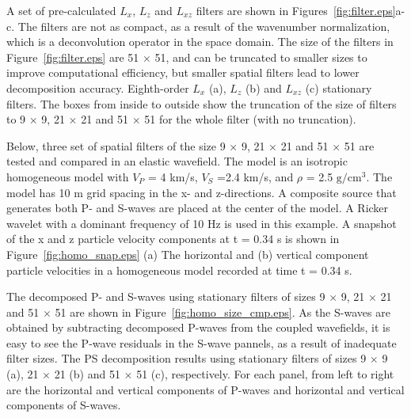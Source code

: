 \documentclass[manuscript,ulem,graphix,revised]{geophysics}
\begin{document}
A set of pre-calculated $L_x$, $L_z$ and $L_{xz}$ filters are shown in Figures~\ref{fig:filter.eps}a-c. The filters are not as compact, as a result of the wavenumber normalization, which is a deconvolution operator in the space domain. The size of the filters in Figure~\ref{fig:filter.eps} are 51 $\times$ 51, and can be truncated to smaller sizes to improve computational efficiency, but smaller spatial filters lead to lower decomposition accuracy. 
{
Eighth-order $L_x$ (a), $L_z$ (b) and $L_{xz}$ (c) stationary filters. The boxes from inside to outside show the truncation of the size of filters to 9 $\times$ 9, 21 $\times$ 21 and 51 $\times$ 51 for the whole filter (with no truncation).
}

Below, three set of spatial filters of the size 9 $\times$ 9, 21 $\times$ 21 and 51 $\times$ 51 are tested and compared in an elastic wavefield. The model is an isotropic homogeneous model with $V_P$ = 4 km/s, $V_S$ =2.4 km/s, and $\rho$ = 2.5 $\mathrm{g/cm^3}$. The model has 10 m grid spacing in the x- and z-directions. A composite source that generates both P- and S-waves are placed at the center of the model. A Ricker wavelet with a dominant frequency of 10 Hz is used in this example. A snapshot of the x and z particle velocity components at t = 0.34 s is shown in Figure~\ref{fig:homo_snap.eps}
{
(a) The horizontal and (b) vertical component particle velocities in a homogeneous model recorded at time t = 0.34 s.
}

The decomposed P- and S-waves using stationary filters of sizes 9 $\times$ 9, 21 $\times$ 21 and 51 $\times$ 51 are shown in Figure~\ref{fig:homo_size_cmp.eps}. As the S-waves are obtained by subtracting decomposed P-waves from the coupled wavefields, it is easy to see the P-wave residuals in the S-wave pannels, as a result of inadequate filter sizes.
{
The PS decomposition results using stationary filters of sizes 9 $\times$ 9 (a), 21 $\times$ 21 (b) and 51 $\times$ 51 (c), respectively. For each panel, from left to right are the horizontal and vertical components of P-waves and horizontal and vertical components of S-waves.
}
  
\end{document}
